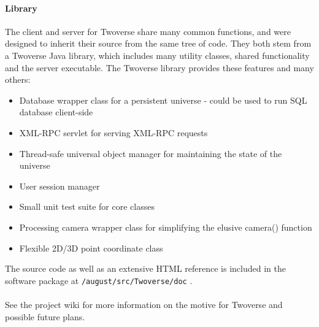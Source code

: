 \paragraph{Library}
The client and server for Twoverse share many common functions, and were designed to inherit their source from the same tree of code. They both stem from a Twoverse Java library, which includes many utility classes, shared functionality and the server executable. The Twoverse library provides these features and many others:
\begin{itemize}
\item Database wrapper class for a persistent universe - could be used to run SQL database client-side
\item XML-RPC servlet for serving XML-RPC requests
\item Thread-safe universal object manager for maintaining the state of the universe
\item User session manager
\item Small unit test suite for core classes
\item Processing camera wrapper class for simplifying the elusive camera() function
\item Flexible 2D/3D point coordinate class
\end{itemize}
The source code as well as an extensive HTML reference is included in the software package at \texttt{/august/src/Twoverse/doc} \cite{PACK}.
\paragraph{}
See the project wiki \cite{WIKI} for more information on the motive for Twoverse and possible future plans.
